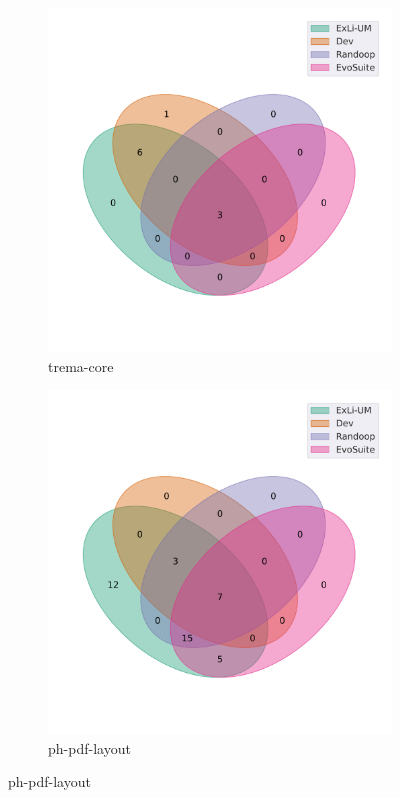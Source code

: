 \begin{figure}[t]\ContinuedFloat
\begin{subfigure}[b]{0.45\textwidth}
\includegraphics[width=\textwidth]{figures/venn/netceteragroup_trema-core-venn.pdf}
\vspace{-10pt}
\caption{trema-core}
\label{fig:venn-netceteragroup_trema-core}
\end{subfigure}
\hfill
\begin{subfigure}[b]{0.45\textwidth}
\includegraphics[width=\textwidth]{figures/venn/phax_ph-pdf-layout-venn.pdf}
\vspace{-10pt}
\caption{ph-pdf-layout}
\label{fig:venn-phax_ph-pdf-layout}
\end{subfigure}
\end{figure}
